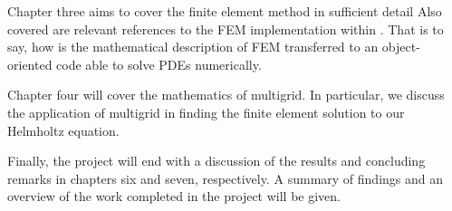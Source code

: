Chapter three aims to cover the finite element method in sufficient detail 
Also covered are relevant references to the FEM implementation within \oomph.
That is to say, how is the mathematical description of FEM transferred to an object-oriented code able to solve PDEs numerically.

Chapter four will cover the mathematics of multigrid.
In particular, we discuss the application of multigrid in finding the finite element solution to our Helmholtz equation.

Finally, the project will end with a discussion of the results and concluding remarks in chapters six and seven, respectively.
A summary of findings and an overview of the work completed in the project will be given.